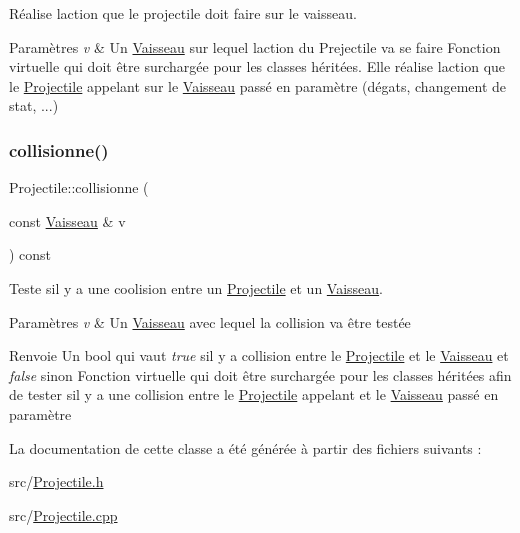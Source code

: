 Réalise l\textquotesingle{}action que le projectile doit faire sur le vaisseau. 


\begin{DoxyParams}{Paramètres}
{\em v} & Un {\ttfamily \hyperlink{class_vaisseau}{Vaisseau}} sur lequel l\textquotesingle{}action du {\ttfamily Prejectile} va se faire Fonction virtuelle qui doit être surchargée pour les classes héritées. Elle réalise l\textquotesingle{}action que le {\ttfamily \hyperlink{class_projectile}{Projectile}} appelant sur le {\ttfamily \hyperlink{class_vaisseau}{Vaisseau}} passé en paramètre (dégats, changement de stat, ...) \\
\hline
\end{DoxyParams}
\mbox{\label{class_projectile_aa5d38357da8a5fdc622b248a449523a5}} 
\subsubsection{\texorpdfstring{collisionne()}{collisionne()}}
{\footnotesize\ttfamily Projectile\+::collisionne (\begin{DoxyParamCaption}\item[{const \hyperlink{class_vaisseau}{Vaisseau} \&}]{v }\end{DoxyParamCaption}) const\hspace{0.3cm}{\ttfamily [pure virtual]}}



Teste s\textquotesingle{}il y a une coolision entre un {\ttfamily \hyperlink{class_projectile}{Projectile}} et un {\ttfamily \hyperlink{class_vaisseau}{Vaisseau}}. 


\begin{DoxyParams}{Paramètres}
{\em v} & Un {\ttfamily \hyperlink{class_vaisseau}{Vaisseau}} avec lequel la collision va être testée \\
\hline
\end{DoxyParams}
\begin{DoxyReturn}{Renvoie}
Un {\ttfamily bool} qui vaut {\itshape true} s\textquotesingle{}il y a collision entre le {\ttfamily \hyperlink{class_projectile}{Projectile}} et le {\ttfamily \hyperlink{class_vaisseau}{Vaisseau}} et {\itshape false} sinon Fonction virtuelle qui doit être surchargée pour les classes héritées afin de tester s\textquotesingle{}il y a une collision entre le {\ttfamily \hyperlink{class_projectile}{Projectile}} appelant et le {\ttfamily \hyperlink{class_vaisseau}{Vaisseau}} passé en paramètre 
\end{DoxyReturn}


La documentation de cette classe a été générée à partir des fichiers suivants \+:\begin{DoxyCompactItemize}
\item 
src/\hyperlink{_projectile_8h}{Projectile.\+h}\item 
src/\hyperlink{_projectile_8cpp}{Projectile.\+cpp}\end{DoxyCompactItemize}
